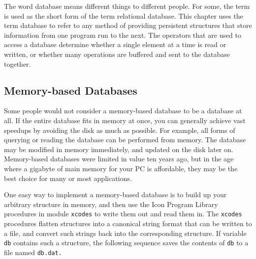 The word {\textquotedbl}database{\textquotedbl} means different things
to different people. For some, the term is used as the short form of
the term {\textquotedbl}relational database.{\textquotedbl} This
chapter uses the term database to refer to any method of providing
{\textquotedbl}persistent structures{\textquotedbl} that store
information from one program run to the next. The operators that are
used to access a database determine whether a single element at a time
is read or written, or whether many operations are buffered and sent to
the database together.

\subsection{Memory-based Databases}

Some people would not consider a memory-based
database to be a database at all. If the
entire database fits in memory at once, you can generally achieve vast
speedups by avoiding the disk as much as possible. For example, all
forms of querying or reading the database can be performed from memory.
The database may be modified in memory immediately, and updated on the
disk later on. Memory-based databases were limited in value ten years
ago, but in the age where a gigabyte of main memory for your PC is
affordable, they may be the best choice for many or most applications.

One easy way to implement a memory-based database is to build up your
arbitrary structure in memory, and then use the Icon Program Library
procedures in module \texttt{xcodes} to write them out and read them
in. The \texttt{xcodes} procedures flatten structures
into a canonical string format that can be written to a file, and
convert such strings back into the corresponding structure. If variable
\texttt{db} contains such a structure, the following sequence saves the
contents of \texttt{db} to a file named \texttt{db.dat.}


